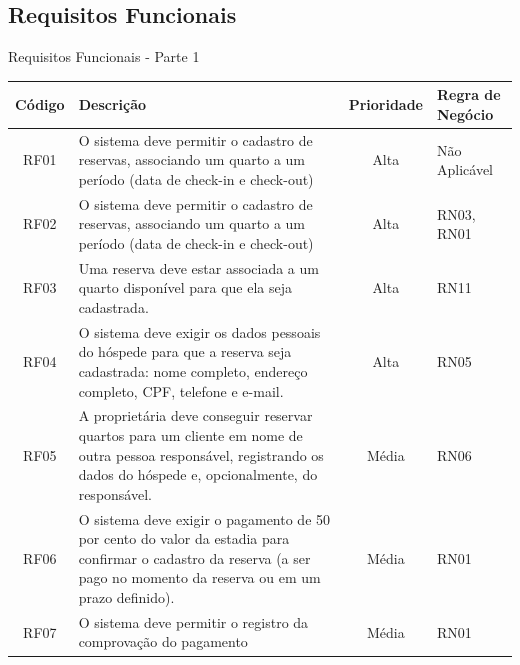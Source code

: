 \documentclass[
	12pt,				%
	openany,			%
	twoside,			%
	a4paper,			%
	english,			%
	french,				%
	spanish,			%
	brazil				%
	]{abntex2}
\begin{document}
\subsection{Requisitos Funcionais}
\begin{quadro}[H]
	\caption{Requisitos Funcionais - Parte 1}
	\label{quadro_rf1}
	\begin{tabular}{|c|p{5cm}|c|p{4cm}|}
		\hline
		\textbf{Código} & \textbf{Descrição} & \textbf{Prioridade} & \textbf{Regra de Negócio} \\ \hline
		RF01 & O sistema deve permitir o cadastro de reservas, associando um quarto a um período (data de check-in e check-out) & Alta & Não Aplicável \\ \hline
		RF02 & O sistema deve permitir o cadastro de reservas, associando um quarto a um período (data de check-in e check-out) & Alta & RN03, RN01 \\ \hline
		RF03 & Uma reserva deve estar associada a um quarto disponível para que ela seja cadastrada. & Alta & RN11 \\ \hline
		RF04 & O sistema deve exigir os dados pessoais do hóspede para que a reserva seja cadastrada: nome completo, endereço completo, CPF, telefone e e-mail. & Alta & RN05 \\ \hline
		RF05 & A proprietária deve conseguir reservar quartos para um cliente em nome de outra pessoa responsável, registrando os dados do hóspede e, opcionalmente, do responsável. & Média & RN06 \\ \hline
		RF06 & O sistema deve exigir o pagamento de 50 por cento do valor da estadia para confirmar o cadastro da reserva (a ser pago no momento da reserva ou em um prazo definido). & Média & RN01 \\ \hline
		RF07 & O sistema deve permitir o registro da comprovação do pagamento & Média & RN01 \\ \hline
	\end{tabular}
\end{quadro}
\end{document}
